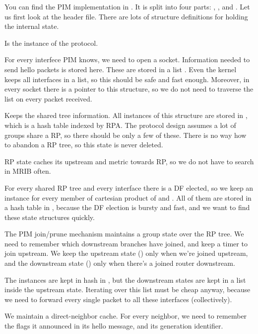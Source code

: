 You can find the PIM implementation in . It is split into four
parts: , ,  and . Let us first
look at the header file. There are lots of structure definitions for holding
the internal state.

\begin{description}[style=nextline]
\item[\ttt{pim\_proto}]
  Is the instance of the protocol.

\item[\ttt{pim\_iface}]
  For every interfece PIM knows, we need to open a socket. Information needed
  to send hello packets is stored here. These are stored in a list
  . Even the kernel keeps all interfaces in a list, so
  this should be safe and fast enough. Moreover, in every socket there is
  a pointer to this structure, so we do not need to traverse the list on every
  packet received.

\item[\ttt{pim\_rp}]
  Keeps the shared tree information. All instances of this structure are stored
  in , which is a hash table indexed by RPA. The
  protocol design assumes a lot of groups share a RP, so there should be only
  a few of these. There is no way how to abandon a RP tree, so this state is
  never deleted.

  RP state caches its upstream and metric towards RP, so we do not have to
  search in MRIB often.

\item[\ttt{pim\_rp\_iface}]
  For every shared RP tree and every interface there is a DF elected, so we
  keep an instance for every member of cartesian product of  and
  . All of them are stored in a hash table in ,
  because the DF election is bursty and fast, and we want to find these state
  structures quickly.

\item[\ttt{pim\_grp}, \ttt{pim\_grp\_iface}]
  The PIM join/prune mechanism maintains a group state over the RP tree. We
  need to remember which downstream branches have joined, and keep a timer to
  join upstream. We keep the upstream state () only when we're
  joined upstream, and the downstream state  () only when
  there's a joined router downstream.

  The  instances are kept in hash in , but the
  downstream states are kept in a list inside the upstream state. Iterating
  over this list must be cheap anyway, because we need to forward every single
  packet to all these interfaces (collectively).

\item[\ttt{pim\_neigh}]
  We maintain a direct-neighbor cache. For every neighbor, we need to remember
  the flags it announced in its hello message, and its generation identifier.

\end{description}

